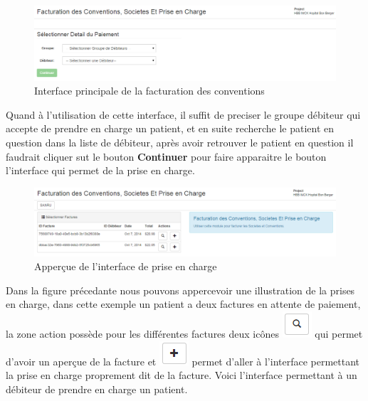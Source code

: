 \documentclass[12pt,a4paper]{report}
\begin{document}
\begin{figure}[h]
\begin{center}
\includegraphics[width=14cm]{pic/FacturationConv.png}
\end{center}
\caption{Interface principale de la facturation des conventions}
\label{Interface principale de la facturation des conventions}
\end{figure}

Quand à l'utilisation de cette interface, il suffit de preciser le groupe débiteur qui accepte de prendre en charge un patient, et en suite recherche le patient en question dans la liste de débiteur, après avoir retrouver le patient en question il faudrait cliquer sut le bouton  \textbf{Continuer} pour faire apparaitre le bouton l'interface qui permet de la prise en charge.

\begin{figure}[h]
\begin{center}
\includegraphics[width=14cm]{pic/FactPrCharge.png}
\end{center}
\caption{Apperçue de l'interface de prise en charge}
\label{Apperçue de l'interface de prise en charge}
\end{figure}

Dans la figure précedante nous pouvons appercevoir une illustration de la prises en charge, dans cette exemple un patient a deux factures en attente de paiement, la zone action possède pour les différentes factures deux icônes \includegraphics[scale=0.7]{pic/LoopBlack.png} qui permet d'avoir un aperçue de la facture et \includegraphics[scale=0.7]{pic/plusBlack.png} permet d'aller à l'interface permettant la prise en charge proprement dit de la facture. 
Voici l'interface permettant à un débiteur de prendre en charge un patient.
\end{document}
